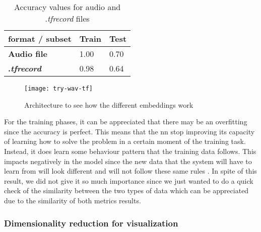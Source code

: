 	\begin{table}[h]
		\begin{center}
			\centering
			\begin{tabular}{|| m{7em} | m{7em} | m{7em} ||}
				\hline
				format / subset & \textbf{Train} & \textbf{Test} \\
				\hline\hline
				\textbf{Audio file} & 1.00 & 0.70 \\
				\hline
				\textbf{.\textit{tfrecord}} & 0.98 & 0.64 \\
				\hline
			\end{tabular}
		\end{center}
		\caption{Accuracy values for audio and .\textit{tfrecord} files}
		\label{table:5}
	\end{table}
	
	\begin{wrapfigure}[15]{R}{0.4\textwidth}
		\centering
		\captionsetup{justification=centering}
		\texttt{[image: try-wav-tf]}
		\caption{Architecture to see how the different embeddings work}
		\label{fig:mesh5}
	\end{wrapfigure}
	
	For the training phases, it can be appreciated that there may be an overfitting since the accuracy is perfect. This means that the \acrshort{nn} stop improving its capacity of learning how to solve the problem in a certain moment of the training task. Instead, it does learn some behaviour pattern that the training data follows. This impacts negatively in the model since the new data that the system will have to learn from will look different and will not follow these same rules \cite{Jabbar2015}. In spite of this result, we did not give it so much importance since we just wanted to do a quick check of the similarity between the two types of data which can be appreciated due to the similarity of both metrics results.
	
\subsubsection{Dimensionality reduction for visualization}
\label{subsection:dimensionality-reduction-for-visualization}

